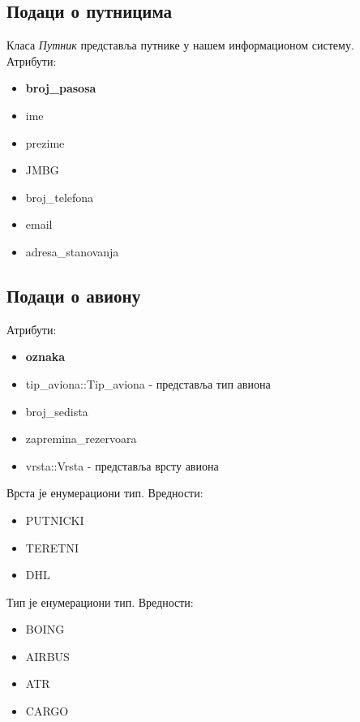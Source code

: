 \documentclass{article}
\begin{document}
\newpage
\subsection{Подаци о путницима}

Класа \textit{Путник} представља путнике у нашем информационом систему. \\

Атрибути:
\begin{itemize}
    \item \textbf{broj\_pasosa}
    \item ime
    \item prezime
    \item JMBG
    \item broj\_telefona
    \item email
    \item adresa\_stanovanja
\end{itemize}

\subsection{Подаци о авиону}

Атрибути:
\begin{itemize}
    \item \textbf{oznaka}
    \item tip\_aviona::Tip\_aviona - представља тип авиона
    \item broj\_sedista
    \item zapremina\_rezervoara
    \item vrsta::Vrsta - представља врсту авиона
\end{itemize}

\vspace{10}
Врста је енумерациони тип. 
Вредности: 
\begin{itemize}
    \item PUTNICKI
    \item TERETNI
    \item DHL
\end{itemize}

\vspace{10}
Тип је енумерациони тип. 
Вредности: 
\begin{itemize}
    \item BOING
    \item AIRBUS
    \item ATR
    \item CARGO
\end{itemize}
\end{document}
